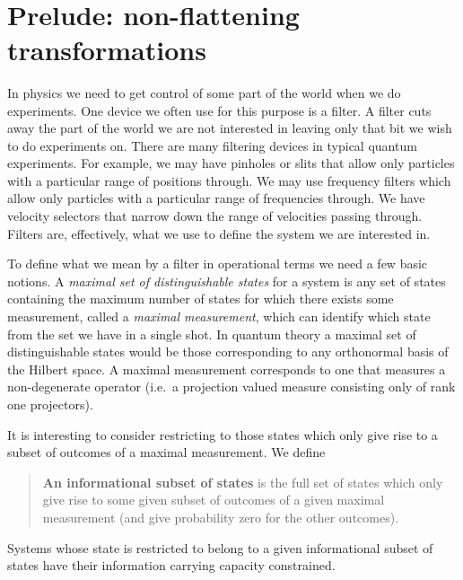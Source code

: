 \documentclass[10pt]{article}
\begin{document}

\newpage

\pagestyle{plain}

\setcounter{page}{1}

{~}


\tableofcontents

\newpage

\setcounter{page}{1}

\section*{Prelude: non-flattening transformations}



In physics we need to get control of some part of the world when we do experiments.  One device we often use for this purpose is a filter.  A filter cuts away the part of the world we are not interested in leaving only that bit we wish to do experiments on.  There are many filtering devices in typical quantum experiments. For example, we may have pinholes or slits that allow only particles with a particular range of positions through.  We may use frequency filters which allow only particles with a particular range of frequencies through.  We have velocity selectors that narrow down the range of velocities passing through.   Filters are, effectively, what we use to define the system we are interested in.

To define what we mean by a filter in operational terms we need a few basic notions.  A \emph{maximal set of distinguishable states} for a system is any set of states containing the maximum number of states for which there exists some measurement, called a \emph{maximal measurement}, which can identify which state from the set we have in a single shot.  In quantum theory a maximal set of distinguishable states would be those corresponding to any orthonormal basis of the Hilbert space.  A maximal measurement corresponds to one that measures a non-degenerate operator (i.e.\ a projection valued measure consisting only of rank one projectors).

It is interesting to consider restricting to those states which only give rise to a subset of outcomes of a maximal measurement.  We define
\begin{quote}
{\bf An informational subset of states} is the full set of states which only give rise to some given subset of outcomes of a given maximal measurement (and give probability zero for the other outcomes).
\end{quote}
Systems whose state is restricted to belong to a given informational subset of states have their information carrying capacity constrained.
\end{document}
